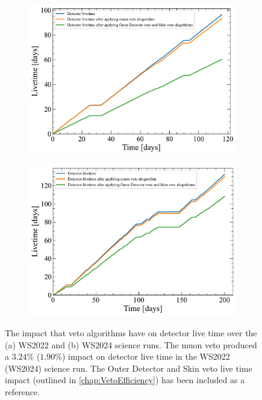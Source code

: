 \begin{figure}[h!]
\centering
\begin{subfigure}{0.47\textwidth}
    \includegraphics[width=\textwidth]{figures/Muons/SR1WSAnalysis_SR1-WSv5_LZAP-5.4.6_v36_run_time_comparison.pdf}
    \caption{}
    \label{fig:WS2022_MuonVetoLivetimeImpact}
\end{subfigure}
\hfill
\begin{subfigure}{0.47\textwidth}
    \includegraphics[width=\textwidth]{figures/Muons/SR3-WSv5_LZAP-5.4.6_run_time_comparison.pdf}
    \caption{}
    \label{fig:WS2024_MuonVetoLivetimeImpact}
\end{subfigure}
\caption[The impact that veto algorithms have on detector live time over the WS2022 and WS2024 science runs.]{The impact that veto algorithms have on detector live time over the (a) WS2022 and (b) WS2024 science runs. The muon veto produced a $3.24\%$ ($1.90\%$) impact on detector live time in the WS2022 (WS2024) science run. The Outer Detector and Skin veto live time impact (outlined in \autoref{chap:VetoEfficiency}) has been included as a reference.}
\label{fig:MuonVetoLivetimeImpact}
\end{figure}

